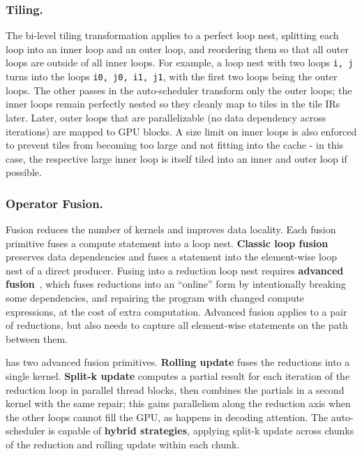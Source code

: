 \subsubsection{Tiling.}
The bi-level tiling transformation applies to a perfect loop nest,
splitting each loop into an inner loop and an outer loop,
and reordering them so that all outer loops are outside of all inner loops.
For example, a loop nest with two loops \texttt{i, j} turns into the loops
\texttt{i0, j0, i1, j1}, with the first two loops being the outer loops.
The other passes in the auto-scheduler transform only the outer loops;
the inner loops remain perfectly nested so they cleanly map to tiles in the tile IRs later.
Later, outer loops that are parallelizable (no data dependency across iterations)
are mapped to GPU blocks.
A size limit on inner loops is also enforced to prevent tiles from becoming
too large and not fitting into the cache - in this case, the respective large inner loop is itself
tiled into an inner and outer loop if possible.


\subsubsection{Operator Fusion.}\label{sec:adv-fusion}
Fusion reduces the number of kernels and improves data locality.
Each fusion primitive fuses a compute statement into a loop nest.
\textbf{Classic loop fusion} preserves data dependencies
and fuses a statement into the element-wise loop nest of a direct producer.
Fusing into a reduction loop nest requires \textbf{advanced fusion}~\cite{neptune},
which fuses reductions into an ``online'' form by intentionally breaking some dependencies,
and repairing the program with changed compute expressions, at the cost of extra computation.
Advanced fusion applies to a pair of reductions,
but also needs to capture all element-wise statements on the path between them.

\NAME{} has two advanced fusion primitives.
\textbf{Rolling update} fuses the reductions into a single kernel.
\textbf{Split-k update} computes a partial result for each iteration of the reduction loop
in parallel thread blocks, then combines the partials in a second kernel with the same repair;
this gains parallelism along the reduction axis when the other loops cannot fill the GPU,
as happens in decoding attention.
The auto-scheduler is capable of \textbf{hybrid strategies}, applying split-k update across chunks
of the reduction and rolling update within each chunk.

